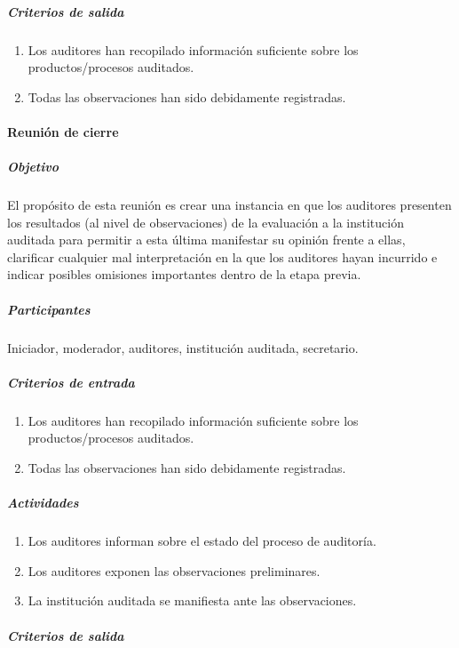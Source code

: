 \subparagraph{Criterios de salida\\}

\begin{enumerate}
	\item
		Los auditores han recopilado información suficiente sobre los productos/procesos auditados.
	\item
		Todas las observaciones han sido debidamente registradas.
\end{enumerate}

\paragraph{Reunión de cierre}

\subparagraph{Objetivo\\}

El propósito de esta reunión es crear una instancia en que los auditores presenten los resultados (al nivel de observaciones) de la evaluación a la institución auditada para permitir a esta última manifestar su opinión frente a ellas, clarificar cualquier mal interpretación en la que los auditores hayan incurrido e indicar posibles omisiones importantes dentro de la etapa previa.

\subparagraph{Participantes\\}

Iniciador, moderador, auditores, institución auditada, secretario.

\subparagraph{Criterios de entrada}

\begin{enumerate}
	\item
		Los auditores han recopilado información suficiente sobre los productos/procesos auditados.
	\item 
		Todas las observaciones han sido debidamente registradas.
\end{enumerate}

\subparagraph{Actividades}

\begin{enumerate}
	\item
		Los auditores informan sobre el estado del proceso de auditoría.
	\item
		Los auditores exponen las observaciones preliminares.
	\item
		La institución auditada se manifiesta ante las observaciones. 
\end{enumerate}

\subparagraph{Criterios de salida}


